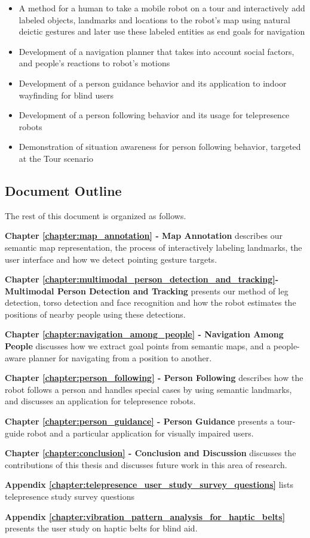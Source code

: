 \begin{itemize}
\item A method for a human to take a mobile robot on a tour and interactively add labeled objects, landmarks and locations to the robot's map using natural deictic gestures and later use these labeled entities as end goals for navigation
\item Development of a navigation planner that takes into account social factors, and people's reactions to robot's motions
\item Development of a person guidance behavior and its application to indoor wayfinding for blind users
\item Development of a person following behavior and its usage for telepresence robots
\item Demonstration of situation awareness for person following behavior, targeted at the Tour scenario
\end{itemize}


\subsection{Document Outline}

The rest of this document is organized as follows.

\textbf{Chapter \ref{chapter:map_annotation} - Map Annotation} describes our semantic map representation, the process of interactively labeling landmarks, the user interface and how we detect pointing gesture targets.

\textbf{Chapter \ref{chapter:multimodal_person_detection_and_tracking}- Multimodal Person Detection and Tracking} presents our method of leg detection, torso detection and face recognition and how the robot estimates the positions of nearby people using these detections.

\textbf{Chapter \ref{chapter:navigation_among_people} - Navigation Among People} discusses how we extract goal points from semantic maps, and a people-aware planner for navigating from a position to another.

\textbf{Chapter \ref{chapter:person_following} - Person Following} describes how the robot follows a person and handles special cases by using semantic landmarks, and discusses an application for telepresence robots.

\textbf{Chapter \ref{chapter:person_guidance} - Person Guidance} presents a tour-guide robot and a particular application for visually impaired users.

\textbf{Chapter \ref{chapter:conclusion} - Conclusion and Discussion} discusses the contributions of this thesis and discusses future work in this area of research.

\textbf{Appendix \ref{chapter:telepresence_user_study_survey_questions}} lists telepresence study survey questions

\textbf{Appendix \ref{chapter:vibration_pattern_analysis_for_haptic_belts}} presents the user study on haptic belts for blind aid.

